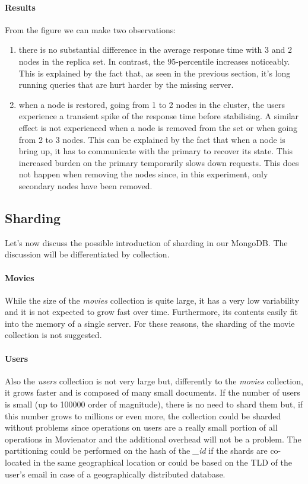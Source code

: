 \documentclass[11pt]{article}
\begin{document}
\paragraph{Results}
From the figure we can make two observations:
\begin{enumerate}
	\item there is no substantial difference in the average response time with 3 and 2 nodes in the replica set. In contrast, the 95-percentile increases noticeably. This is explained by the fact that, as seen in the previous section, it's long running queries that are hurt harder by the missing server.
	\item when a node is restored, going from 1 to 2 nodes in the cluster, the users experience a transient spike of the response time before stabilising. A similar effect is not experienced when a node is removed from the set or when going from 2 to 3 nodes. This can be explained by the fact that when a node is bring up, it has to communicate with the primary to recover its state. This increased burden on the primary temporarily slows down requests. This does not happen when removing the nodes since, in this experiment, only secondary nodes have been removed.
\end{enumerate}

\subsection{Sharding}
Let's now discuss the possible introduction of sharding in our MongoDB. The discussion will be differentiated by collection.

\paragraph{Movies}
While the size of the \emph{movies} collection is quite large, it has a very low variability and it is not expected to grow fast over time. Furthermore, its contents easily fit into the memory of a single server. For these reasons, the sharding of the movie collection is not suggested.

\paragraph{Users}
Also the \emph{users} collection is not very large but, differently to the \emph{movies} collection, it grows faster and is composed of many small documents. If the number of users is small (up to 100000 order of magnitude), there is no need to shard them but, if this number grows to millions or even more, the collection could be sharded without problems since operations on users are a really small portion of all operations in Movienator and the additional overhead will not be a problem. The partitioning could be performed on the hash of the \emph{\_id} if the shards are co-located in the same geographical location or could be based on the TLD of the user's email in case of a geographically distributed database.
\end{document}
